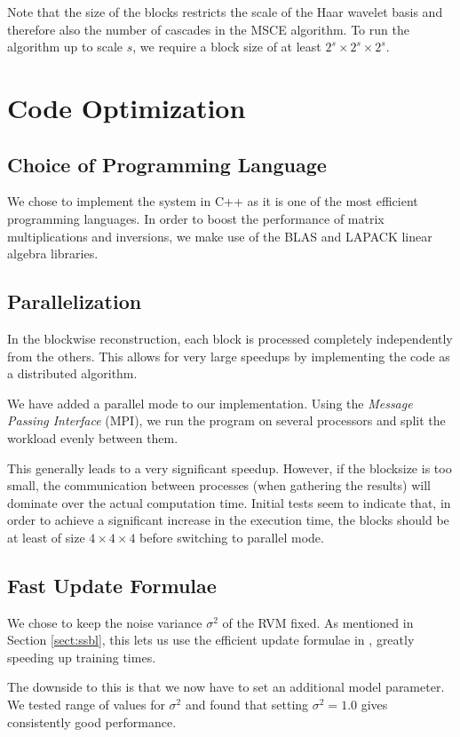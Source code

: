 Note that the size of the blocks restricts the scale of the Haar wavelet basis and therefore also the number of cascades in the MSCE algorithm.
To run the algorithm up to scale $s$, we require a block size of at least $2^s\times 2^s\times 2^s$.

\section{Code Optimization}

\subsection{Choice of Programming Language}
We chose to implement the system in C++ as it is one of the most efficient programming languages.
In order to boost the performance of matrix multiplications and inversions, we make use of the BLAS and LAPACK linear algebra libraries.

\subsection{Parallelization}
In the blockwise reconstruction, each block is processed completely independently from the others.
This allows for very large speedups by implementing the code as a distributed algorithm.

We have added a parallel mode to our implementation.
Using the \emph{Message Passing Interface} (MPI), we run the program on several processors and split the workload evenly between them.

This generally leads to a very significant speedup.
However, if the blocksize is too small, the communication between processes (when gathering the results) will dominate over the actual computation time.
Initial tests seem to indicate that, in order to achieve a significant increase in the execution time, the blocks should be at least of size $4\times4\times4$ before switching to parallel mode.


\subsection{Fast Update Formulae}
We chose to keep the noise variance $\sigma^2$ of the RVM fixed.
As mentioned in Section \ref{sect:ssbl}, this lets us use the efficient update formulae in \cite{tipping2003}, greatly speeding up training times.

The downside to this is that we now have to set an additional model parameter.
We tested range of values for $\sigma^2$ and found that setting $\sigma^2 = 1.0$ gives consistently good performance.

